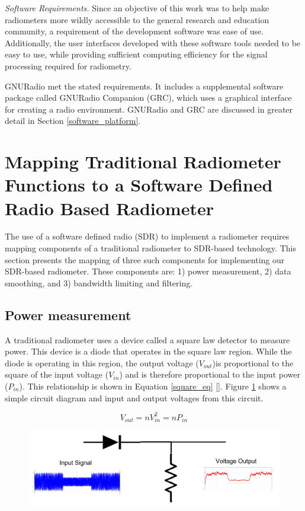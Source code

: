 \emph{Software Requirements.}  Since an objective of this work was to help make radiometers more wildly accessible to the general research and education community, a requirement of the development software was ease of use.  Additionally, the user interfaces developed with these software tools needed to be easy to use, while providing sufficient computing efficiency for the signal processing required for radiometry.

GNURadio met the stated requirements.  It includes a supplemental software package called GNURadio Companion (GRC), which uses a graphical interface for creating a radio environment.  GNURadio and GRC are discussed in greater detail in Section \ref{software_platform}.

\section{Mapping Traditional Radiometer Functions to a Software Defined Radio Based Radiometer}

The use of a software defined radio (SDR) to implement a radiometer requires mapping components of a traditional radiometer to SDR-based technology.  This section presents the mapping of three such components for implementing our SDR-based radiometer.  These components are:  1) power measurement, 2) data smoothing, and 3) bandwidth limiting and filtering.

\subsection{Power measurement}

A traditional radiometer uses a device called a square law detector to measure power.  This device is a diode that operates in the square law region.  While the diode is operating in this region, the output voltage ($V_{out}$)is proportional to the square of the input voltage ($V_{in}$) and is therefore proportional to the input power ($P_{in}$).  This relationship is shown in Equation \ref{square_eq} [\cite{Navy_detector}].  Figure \ref{square_law_simple} shows a simple circuit diagram and input and output voltages from this circuit.

\begin{equation}\label{square_eq}
V_{out} = nV_{in}^2 = nP_{in}
\end{equation}

{\begin{figure}[h!tb] 
\centering
\includegraphics[width=17cm]{Images/square_law.pdf}
\label{square_law_simple}
\end{figure}
}

